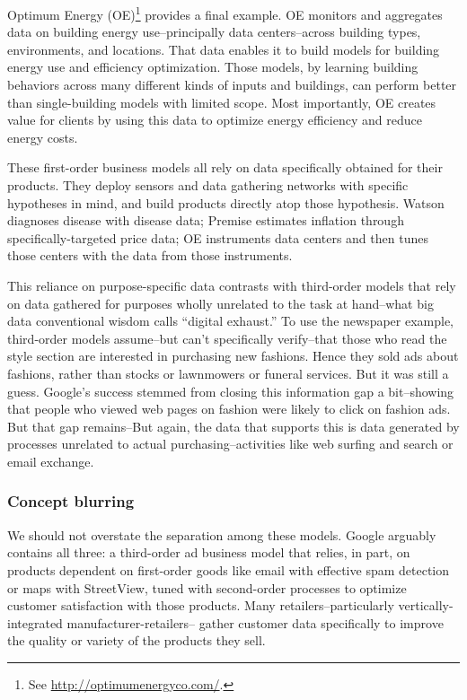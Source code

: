 \documentclass[12pt]{article}
\begin{document}
Optimum Energy (OE)\footnote{See \url{http://optimumenergyco.com/}.} provides a final example. OE monitors and
aggregates data on building energy use--principally data
centers--across building types, environments, and locations. That data
enables it to build models for building energy use and efficiency
optimization. Those models, by learning building behaviors across many
different kinds of inputs and buildings, can perform better than
single-building models with limited scope. Most importantly, OE
creates value for clients by using this data to optimize energy
efficiency and reduce energy costs.

These first-order business models all rely on data specifically
obtained for their products. They deploy sensors and data gathering
networks with specific hypotheses in mind, and build products directly
atop those hypothesis. Watson diagnoses disease with disease data;
Premise estimates inflation through specifically-targeted price data;
OE instruments data centers and then tunes those centers with the data
from those instruments.

This reliance on purpose-specific data contrasts with third-order
models that rely on data gathered for purposes wholly unrelated to the
task at hand--what big data conventional wisdom calls ``digital
exhaust.'' To use the newspaper example, third-order models
assume--but can't specifically verify--that those who read the style
section are interested in purchasing new fashions. Hence they sold ads
about fashions, rather than stocks or lawnmowers or funeral
services. But it was still a guess. Google's success stemmed from
closing this information gap a bit--showing that people who viewed web
pages on fashion were likely to click on fashion ads. But that gap remains--But again, the
data that supports this is data generated by processes unrelated to
actual purchasing--activities like web surfing and search or email
exchange. 


\subsubsection{Concept blurring}
\label{sec:concept-blurring}

We should not overstate the separation among these models. Google
arguably contains all three: a third-order ad business model that
relies, in part, on products dependent on first-order goods like email
with effective spam detection or maps with StreetView, tuned with
second-order processes to optimize customer satisfaction with those
products. Many retailers--particularly vertically-integrated
manufacturer-retailers-- gather customer data specifically to improve
the quality or variety of the products they sell.
\end{document}
